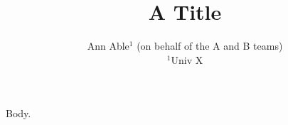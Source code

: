 \documentclass{article}
\begin{document}
\title{A Title}
\author{Ann Able$^1$ (on behalf of the A and B teams) \\ $^1$Univ X}
\maketitle
Body.
\end{document}
